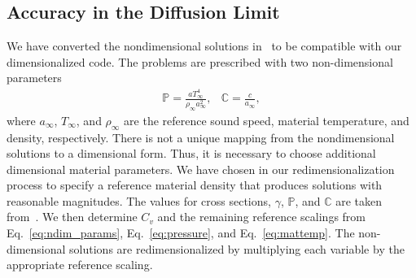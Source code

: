\documentclass[preprint,12pt]{elsarticle}
\begin{document}
\subsection{Accuracy in the Diffusion Limit}

We have converted the nondimensional solutions in~\cite{mcclarren2} to be compatible with our dimensionalized code.  The
problems are prescribed with two non-dimensional parameters
\begin{equation}
    \label{eq:ndim_params}
    \begin{matrix}
        \mathbb{P} = {\displaystyle \frac{a T_{\infty}^4}{\rho_{\infty} a_\infty^2} }, &  
        \mathbb{C} = {\displaystyle \frac{c}{a_\infty} },
    \end{matrix}
\end{equation}
where $a_\infty$, $T_{\infty}$, and $\rho_{\infty}$ are the reference sound speed, material temperature, and density, respectively.
There is not a unique mapping from the
nondimensional solutions to a dimensional form.  Thus, it is necessary to choose additional dimensional material parameters.  We have chosen in our redimensionalization process to specify a reference material
density that
produces solutions with reasonable magnitudes. 
The values for cross sections, $\gamma$, $\mathbb{P}$, and $\mathbb{C}$ are taken from~\cite{mcclarren2}.
We then determine $C_v$ and the remaining reference
scalings from Eq.~\eqref{eq:ndim_params}, Eq.~\eqref{eq:pressure}, and Eq.~\eqref{eq:mattemp}. The non-dimensional solutions are
redimensionalized by multiplying each variable by the appropriate reference scaling.
\end{document}
